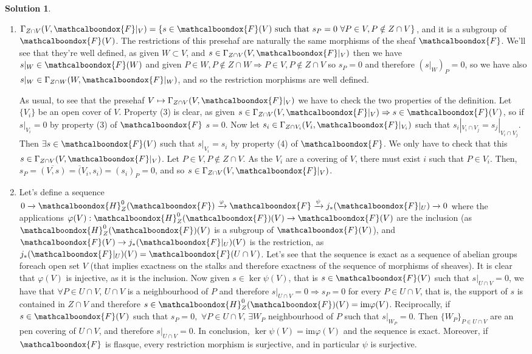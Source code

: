 \documentclass[12pt]{article}
\newcommand{\imp}{\ensuremath{\Rightarrow}}
\newcommand{\ima}{\ensuremath{\mathrm{im}}}
\theoremstyle{definition}
\newtheorem*{sol}{Solution}
\newcommand{\sF}{\ensuremath{\mathcalboondox{F}}}
\newcommand{\sH}{\ensuremath{\mathcalboondox{H}}}
\begin{document}
\begin{sol}
	\begin{enumerate}[label=\alph*)]
		\item $\Gamma_{Z \cap V} (V,\sF|_V) = \{s \in \sF(V) \text{ such that } s_P = 0 \, \, \forall P \in V, P \notin Z \cap V\}$, and it is a subgroup of $\sF(V)$. The restrictions of this presehaf are naturally the same morphisms of the sheaf $\sF$. We'll see that they're well defined, as given $W \subset V$, and $s \in \Gamma_{Z \cap V} (V,\sF|_V)$ then we have $s|_W \in \sF(W)$ and given $P \in W, P \notin Z \cap W \imp P \in V, P \notin Z \cap V$ so $s_P = 0$ and therefore $(s|_W)_P = 0$, so we have also $s|_W \in \Gamma_{Z \cap W} (W,\sF|_W)$, and so the restriction morphisms are well defined. 

		As usual, to see that the presehaf $V \mapsto \Gamma_{Z \cap V} (V,\sF|_V)$ we have to check the two properties of the definition. Let $\{V_i\}$ be an open cover of $V$. Property (3) is clear, as given $s \in \Gamma_{Z \cap V} (V,\sF|_V) \imp s \in \sF(V)$, so if $s|_{V_i} = 0$ by property (3) of $\sF$ $s = 0$. Now let $s_i \in \Gamma_{Z \cap V_i} (V_i,\sF|_{V_i})$ such that $s_i|_{V_i \cap V_j} = s_j|_{V_i \cap V_j}$. Then $\exists s \in \sF(V)$ such that $s|_{V_i} = s_i$ by property (4) of $\sF$. We only have to check that this $s \in \Gamma_{Z \cap V} (V,\sF|_V)$. Let $P \in V, P \notin Z \cap V$. As the $V_i$ are a covering of $V$, there must exist $i$ such that $P \in V_i$. Then, $s_P = \overline{(V,s)} = \overline(V_i, s_i) = (s_i)_P = 0$, and so $s \in \Gamma_{Z \cap V}(V,\sF|_V)$.

		\item Let's define a sequence $0 \xrightarrow[]{} \sH_Z^0(\sF) \xrightarrow[]{\varphi} \sF \xrightarrow[]{\psi} j_*(\sF|_U) \xrightarrow[]{} 0$ where the applications $\varphi(V): \sH_Z^0(\sF)(V) \to \sF(V)$ are the inclusion (as $\sH_Z^0(\sF)(V)$ is a subgroup of $\sF(V)$), and $\sF(V) \to j_*(\sF|_U)(V)$ is the restriction, as $j_*(\sF|_U)(V) = \sF(U \cap V)$. Let's see that the sequence is exact as a sequence of abelian groups foreach open set $V$ (that implies exactness on the stalks and therefore exactness of the sequence of morphisms of sheaves). It is clear that $\varphi(V)$ is injective, as it is the inclusion. Now given $s \in \ker \psi(V)$, that is $s \in \sF(V)$ such that $s|_{U \cap V} = 0$, we have that $\forall P \in U \cap V$, $U \cap V$ is a neighbourhood of $P$ and therefore $s|_{U \cap V} = 0 \imp s_P = 0$ for every $P \in U \cap V$, that is, the support of $s$ is contained in $Z \cap V$ and therefore $s \in \sH^0_{Z}(\sF)(V) = \ima \varphi(V)$. Reciprocally, if $s \in \sF(V)$ such that $s_P = 0, \, \, \forall P \in U \cap V$, $\exists W_P$ neighbourhood of $P$ such that $s|_{W_P} = 0$. Then $\{W_P\}_{P \in U \cap V}$ are an pen covering of $U \cap V$, and therefore $s|_{U \cap V} = 0$. In conclusion, $\ker \psi(V) = \ima \varphi(V)$ and the sequence is exact. Moreover, if $\sF$ is flasque, every restriction morphism is surjective, and in particular $\psi$ is surjective.
	\end{enumerate}
\end{sol}
\end{document}
